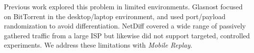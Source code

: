 \documentclass[letterpaper]{sig-alternate-2013}
\begin{document}
Previous work \cite{glasnost, zhang:netdiff, tariq:nano} explored this problem in limited environments. Glasnost focused on BitTorrent in the desktop/laptop environment, and used port/payload randomization to avoid differentiation. NetDiff covered a wide range of passively gathered traffic from a large ISP but likewise did not support targeted, controlled experiments. We address these limitations with \textit{Mobile Replay}.



\end{document}
